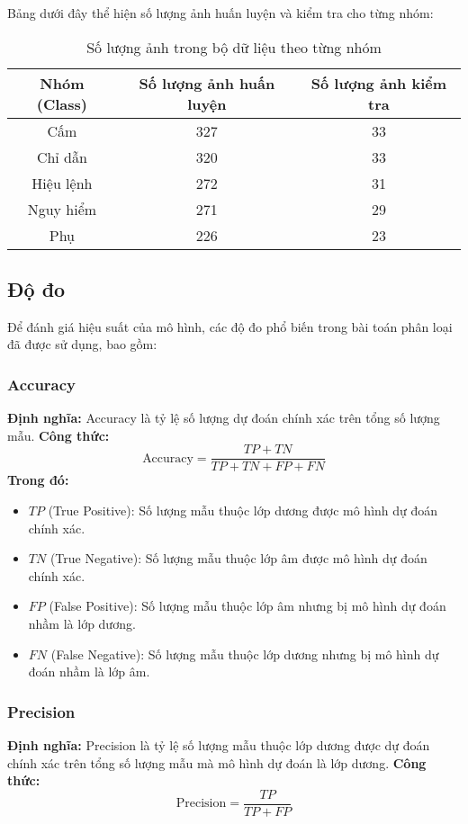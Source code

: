 \documentclass[a4paper,12pt]{article}
\begin{document}
Bảng dưới đây thể hiện số lượng ảnh huấn luyện và kiểm tra cho từng nhóm:  

\begin{table}[H]
    \begin{tabular}{|c|c|c|}
        \hline
        \textbf{Nhóm (Class)} & \textbf{Số lượng ảnh huấn luyện} & \textbf{Số lượng ảnh kiểm tra} \\ \hline
        Cấm & 327 & 33 \\ \hline
        Chỉ dẫn & 320 & 33 \\ \hline
        Hiệu lệnh & 272 & 31 \\ \hline
        Nguy hiểm & 271 & 29 \\ \hline
        Phụ & 226 & 23 \\ \hline
    \end{tabular}
    \centering
    \caption{Số lượng ảnh trong bộ dữ liệu theo từng nhóm}
\end{table}

\subsection{Độ đo}
Để đánh giá hiệu suất của mô hình, các độ đo phổ biến trong bài toán phân loại đã được sử dụng, bao gồm:  

\subsubsection{Accuracy}
\textbf{Định nghĩa:} Accuracy là tỷ lệ số lượng dự đoán chính xác trên tổng số lượng mẫu.  
\textbf{Công thức:}  
\[
\text{Accuracy} = \frac{TP + TN}{TP + TN + FP + FN}
\]
\textbf{Trong đó:}  
\begin{itemize}
    \item \(TP\) (True Positive): Số lượng mẫu thuộc lớp dương được mô hình dự đoán chính xác.
    \item \(TN\) (True Negative): Số lượng mẫu thuộc lớp âm được mô hình dự đoán chính xác.
    \item \(FP\) (False Positive): Số lượng mẫu thuộc lớp âm nhưng bị mô hình dự đoán nhầm là lớp dương.
    \item \(FN\) (False Negative): Số lượng mẫu thuộc lớp dương nhưng bị mô hình dự đoán nhầm là lớp âm.
\end{itemize}

\subsubsection{Precision}
\textbf{Định nghĩa:} Precision là tỷ lệ số lượng mẫu thuộc lớp dương được dự đoán chính xác trên tổng số lượng mẫu mà mô hình dự đoán là lớp dương.  
\textbf{Công thức:}  
\[
\text{Precision} = \frac{TP}{TP + FP}
\]
\end{document}
